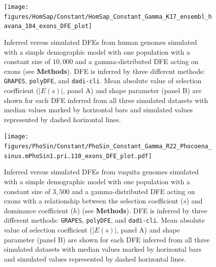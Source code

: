 \documentclass[hidelinks]{article}
\newcommand{\polydfe}{\texttt{polyDFE}\xspace}
\newcommand{\dadicli}{\texttt{dadi-cli}\xspace}
\newcommand{\grapes}{\texttt{GRAPES}\xspace}
\begin{document}
\begin{figure}[h]
    \centering
    \texttt{[image: figures/HomSap/Constant/HomSap\_Constant\_Gamma\_K17\_ensembl\_havana\_104\_exons\_DFE\_plot]}
    \caption{
       Inferred versus simulated DFEs from human genomes simulated with
       a simple demographic model with one population with a constant size of $10,000$
       and a gamma-distributed DFE acting on exons (see \textbf{Methods}).
        DFE is inferred by three different methods: \grapes, \polydfe , and \dadicli.
        Mean absolute value of selection coefficient ($\lvert E(s) \rvert$, panel A) and shape parameter (panel B)
        are shown for each DFE inferred from all three simulated datasets
        with median values marked by horizontal bars
        and simulated values represented by dashed horizontal lines.
    }
    \label{fig:homsap-dfe.constant}
\end{figure}

\begin{figure}[h]
    \centering
    \texttt{[image: figures/PhoSin/Constant/PhoSin\_Constant\_Gamma\_R22\_Phocoena\_sinus.mPhoSin1.pri.110\_exons\_DFE\_plot.pdf]}
    \caption{
    \label{fig:vaquita-dfe.constant}
        Inferred versus simulated DFEs from vaquita genomes simulated with
        a simple demographic model with one population with a constant size of $3,500$
        and a gamma-distributed DFE acting on exons
        with a relationship between the selection coefficient ($s$) and dominance coefficient ($h$) (see \textbf{Methods}).
        DFE is inferred by three different methods: \grapes, \polydfe , and \dadicli.
        Mean absolute value of selection coefficient ($\lvert E(s) \rvert$, panel A) and shape parameter (panel B)
        are shown for each DFE inferred from all three simulated datasets
        with median values marked by horizontal bars
        and simulated values represented by dashed horizontal lines.
    }
\end{figure}

\end{document}

